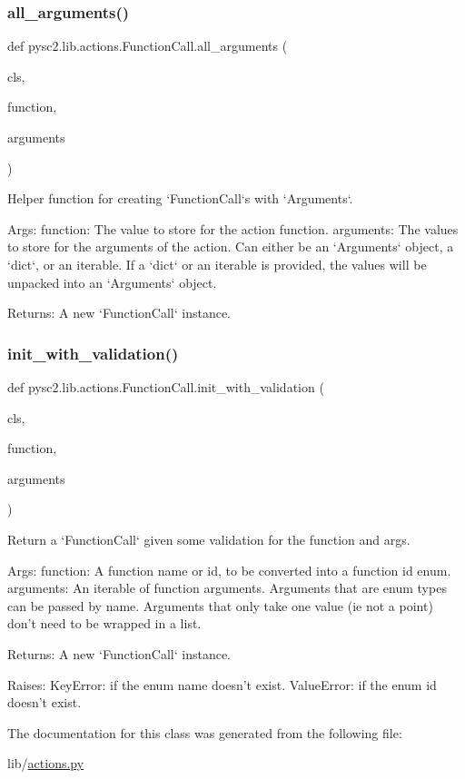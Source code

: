 \subsubsection{\texorpdfstring{all\+\_\+arguments()}{all\_arguments()}}
{\footnotesize\ttfamily def pysc2.\+lib.\+actions.\+Function\+Call.\+all\+\_\+arguments (\begin{DoxyParamCaption}\item[{}]{cls,  }\item[{}]{function,  }\item[{}]{arguments }\end{DoxyParamCaption})}

\begin{DoxyVerb}Helper function for creating `FunctionCall`s with `Arguments`.

Args:
  function: The value to store for the action function.
  arguments: The values to store for the arguments of the action. Can either
be an `Arguments` object, a `dict`, or an iterable. If a `dict` or an
iterable is provided, the values will be unpacked into an `Arguments`
object.

Returns:
  A new `FunctionCall` instance.
\end{DoxyVerb}
 \mbox{\label{classpysc2_1_1lib_1_1actions_1_1_function_call_a5b3cf8e14a7b779c05e7b80bbed4181e}} 
\subsubsection{\texorpdfstring{init\+\_\+with\+\_\+validation()}{init\_with\_validation()}}
{\footnotesize\ttfamily def pysc2.\+lib.\+actions.\+Function\+Call.\+init\+\_\+with\+\_\+validation (\begin{DoxyParamCaption}\item[{}]{cls,  }\item[{}]{function,  }\item[{}]{arguments }\end{DoxyParamCaption})}

\begin{DoxyVerb}Return a `FunctionCall` given some validation for the function and args.

Args:
  function: A function name or id, to be converted into a function id enum.
  arguments: An iterable of function arguments. Arguments that are enum
  types can be passed by name. Arguments that only take one value (ie
  not a point) don't need to be wrapped in a list.

Returns:
  A new `FunctionCall` instance.

Raises:
  KeyError: if the enum name doesn't exist.
  ValueError: if the enum id doesn't exist.
\end{DoxyVerb}
 

The documentation for this class was generated from the following file\+:\begin{DoxyCompactItemize}
\item 
lib/\mbox{\hyperlink{actions_8py}{actions.\+py}}\end{DoxyCompactItemize}
